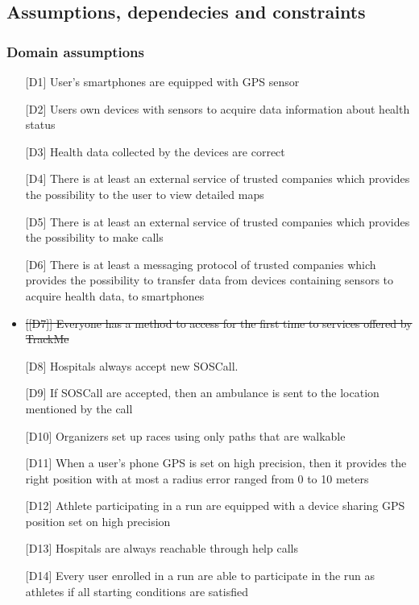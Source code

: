 \subsection{Assumptions, dependecies and constraints}

\subsubsection{Domain assumptions}
\begin{itemize}
\item[{[D1]}] User's smartphones are equipped with GPS sensor
\item[{[D2]}] Users own devices with sensors to acquire data information about health status
\item[{[D3]}] Health data collected by the devices are correct
\item[{[D4]}] There is at least an external service of trusted companies which provides the possibility to the user to view detailed maps
\item[{[D5]}] There is at least an external service of trusted companies which provides the possibility to make calls
\item[{[D6]}] There is at least a messaging protocol of trusted companies which provides the possibility to transfer data from devices containing sensors to acquire health data, to smartphones
\item \st{[{[D7]}] Everyone has a method to access for the first time to services offered by TrackMe}
\item[{[D8]}] Hospitals always accept new SOSCall.
\item[{[D9]}] If SOSCall are accepted, then an ambulance is sent to the location mentioned by the call
\item[{[D10]}] Organizers set up races using only paths that are walkable
\item[{[D11]}] When a user's phone GPS is set on high precision, then it provides the right position with at most a radius error ranged from 0 to 10 meters
\item[{[D12]}] Athlete participating in a run are equipped with a device sharing GPS position set on high precision
\item[{[D13]}] Hospitals are always reachable through help calls
\item[{[D14]}] Every user enrolled in a run are able to participate in the run as athletes if all starting conditions are satisfied
\end{itemize}
